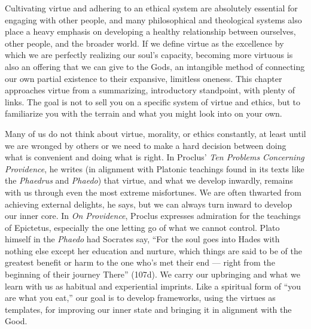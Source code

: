 \documentclass[
]{book}
\begin{document}
Cultivating virtue and adhering to an ethical system are absolutely essential for engaging with other people, and many philosophical and theological systems also place a heavy emphasis on developing a healthy relationship between ourselves, other people, and the broader world. If we define virtue as the excellence by which we are perfectly realizing our soul's capacity, becoming more virtuous is also an offering that we can give to the Gods, an intangible method of connecting our own partial existence to their expansive, limitless oneness. This chapter approaches virtue from a summarizing, introductory standpoint, with plenty of links. The goal is not to sell you on a specific system of virtue and ethics, but to familiarize you with the terrain and what you might look into on your own.

Many of us do not think about virtue, morality, or ethics constantly, at least until we are wronged by others or we need to make a hard decision between doing what is convenient and doing what is right. In Proclus' \emph{Ten Problems Concerning Providence}, he writes (in alignment with Platonic teachings found in its texts like the \emph{Phaedrus} and \emph{Phaedo}) that virtue, and what we develop inwardly, remains with us through even the most extreme misfortunes. We are often thwarted from achieving external delights, he says, but we can always turn inward to develop our inner core. In \emph{On Providence}, Proclus expresses admiration for the teachings of Epictetus, especially the one letting go of what we cannot control. Plato himself in the \emph{Phaedo} had Socrates say, ``For the soul goes into Hades with nothing else except her education and nurture, which things are said to be of the greatest benefit or harm to the one who's met their end --- right from the beginning of their journey There'' (107d). We carry our upbringing and what we learn with us as habitual and experiential imprints. Like a spiritual form of ``you are what you eat,'' our goal is to develop frameworks, using the virtues as templates, for improving our inner state and bringing it in alignment with the Good.
\end{document}
